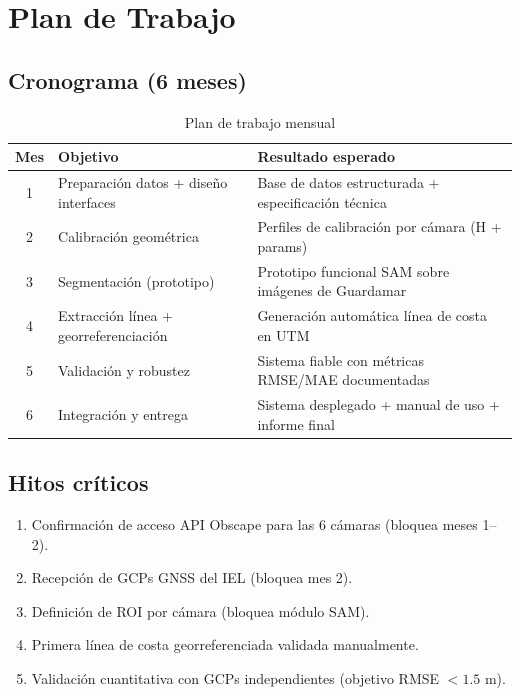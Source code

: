 \chapter{Plan de Trabajo}

\section{Cronograma (6 meses)}

\begin{table}[h!]
\centering
\begin{tabular}{clp{7cm}}
\toprule
\textbf{Mes} & \textbf{Objetivo} & \textbf{Resultado esperado} \\
\midrule
1 & Preparación datos + diseño interfaces
  & Base de datos estructurada + especificación técnica \\
2 & Calibración geométrica
  & Perfiles de calibración por cámara (H + params) \\
3 & Segmentación (prototipo)
  & Prototipo funcional SAM sobre imágenes de Guardamar \\
4 & Extracción línea + georreferenciación
  & Generación automática línea de costa en UTM \\
5 & Validación y robustez
  & Sistema fiable con métricas RMSE/MAE documentadas \\
6 & Integración y entrega
  & Sistema desplegado + manual de uso + informe final \\
\bottomrule
\end{tabular}
\caption{Plan de trabajo mensual}
\end{table}

\section{Hitos críticos}

\begin{enumerate}
  \item Confirmación de acceso API Obscape para las 6 cámaras
        (bloquea meses 1--2).
  \item Recepción de GCPs GNSS del IEL (bloquea mes 2).
  \item Definición de ROI por cámara (bloquea módulo SAM).
  \item Primera línea de costa georreferenciada validada manualmente.
  \item Validación cuantitativa con GCPs independientes
        (objetivo RMSE $< 1.5$ m).
\end{enumerate}
